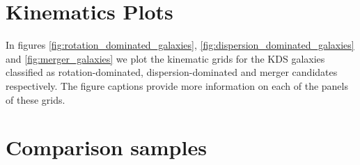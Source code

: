 \documentclass[fleqn,usenatbib]{mn2e}
\begin{document}
\appendix

\section{Kinematics Plots}\label{app:kinematics_plots}
In figures \ref{fig:rotation_dominated_galaxies}, \ref{fig:dispersion_dominated_galaxies} and \ref{fig:merger_galaxies} we plot the kinematic grids for the KDS galaxies classified as rotation-dominated, dispersion-dominated and merger candidates respectively.
The figure captions provide more information on each of the panels of these grids.

\section{Comparison samples}\label{app:comparison_samples}
\end{document}
